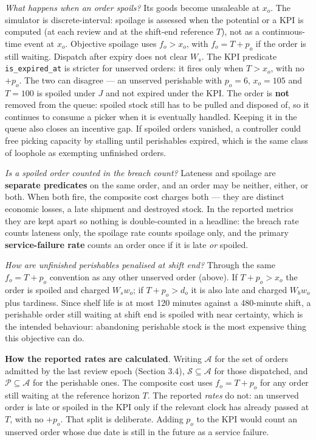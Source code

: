 \documentclass[review,3p,times]{elsarticle}
\theoremstyle{definition}
\begin{document}
\emph{What happens when an order spoils?} Its goods become unsaleable at
\(x_o\). The simulator is discrete-interval: spoilage is assessed when
the potential or a KPI is computed (at each review and at the shift-end
reference \(T\)), not as a continuous-time event at \(x_o\). Objective
spoilage uses \(f_o > x_o\), with \(f_o = T + p_o\) if the order is
still waiting. Dispatch after expiry does not clear \(W_s\). The KPI
predicate \texttt{is\_expired\_at} is stricter for unserved orders: it
fires only when \(T > x_o\), with no \(+p_o\). The two can disagree ---
an unserved perishable with \(p_o=6\), \(x_o=105\) and \(T=100\) is
spoiled under \(J\) and not expired under the KPI. The order is
\textbf{not} removed from the queue: spoiled stock still has to be
pulled and disposed of, so it continues to consume a picker when it is
eventually handled. Keeping it in the queue also closes an incentive
gap. If spoiled orders vanished, a controller could free picking
capacity by stalling until perishables expired, which is the same class
of loophole as exempting unfinished orders.

\emph{Is a spoiled order counted in the breach count?} Lateness and
spoilage are \textbf{separate predicates} on the same order, and an
order may be neither, either, or both. When both fire, the composite
cost charges both --- they are distinct economic losses, a late shipment
and destroyed stock. In the reported metrics they are kept apart so
nothing is double-counted in a headline: the breach rate counts lateness
only, the spoilage rate counts spoilage only, and the primary
\textbf{service-failure rate} counts an order once if it is late
\emph{or} spoiled.

\emph{How are unfinished perishables penalised at shift end?} Through
the same \(f_o = T + p_o\) convention as any other unserved order
(above). If \(T + p_o > x_o\) the order is spoiled and charged
\(W_s w_o\); if \(T + p_o > d_o\) it is also late and charged
\(W_b w_o\) plus tardiness. Since shelf life is at most 120 minutes
against a 480-minute shift, a perishable order still waiting at shift
end is spoiled with near certainty, which is the intended behaviour:
abandoning perishable stock is the most expensive thing this objective
can do.

\textbf{How the reported rates are calculated}. Writing \(\mathcal{A}\)
for the set of orders admitted by the last review epoch (Section 3.4),
\(\mathcal{S} \subseteq \mathcal{A}\) for those dispatched, and
\(\mathcal{P} \subseteq \mathcal{A}\) for the perishable ones. The
composite cost uses \(f_o = T + p_o\) for any order still waiting at the
reference horizon \(T\). The reported \emph{rates} do not: an unserved
order is late or spoiled in the KPI only if the relevant clock has
already passed at \(T\), with no \(+p_o\). That split is deliberate.
Adding \(p_o\) to the KPI would count an unserved order whose due date
is still in the future as a service failure.
\end{document}
